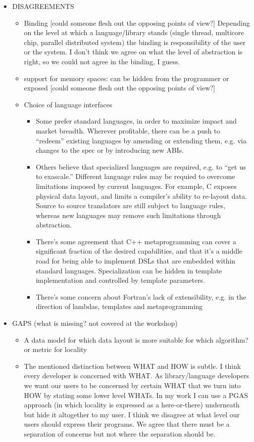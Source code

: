 \begin{itemize}
\item  DISAGREEMENTS
  \begin{itemize}
  \item Binding [could someone flesh out the opposing points of view?] Depending on the level at which a language/library stands (single thread, multicore chip, parallel distributed system) the binding is responsibility of the user or the system. I don't think we agree on what the level of abstraction is right, so we could not agree in the binding, I guess.
  \item support for memory spaces: can be hidden from the programmer or exposed [could someone flesh out the opposing points of view?]
  \item Choice of language interfaces
    \begin{itemize}
    \item Some prefer standard languages, in order to maximize impact and market breadth.  Wherever profitable, there can be a push to ``redeem'' existing languages by amending or extending them, e.g. via changes to the spec or by introducing new ABIs.
    \item Others believe that specialized languages are required, e.g. to ``get us to exascale.''  Different language rules may be requied to overcome limitations imposed by current languages.  For example, C exposes physical data layout, and limits a compiler's ability to re-layout data.  Source to source translators are still subject to language rules, whereas new languages may remove such limitations through abstraction.
    \item There's some agreement that C++ metaprogramming can cover a significant fraction of the desired capabilities, and that it's a middle road for being able to implement DSLs that are embedded within standard languages.  Specialization can be hidden in template implementation and controlled by template parameters.
    \item There's some concern about Fortran's lack of extensibility, e.g. in the direction of lambdas, templates and metaprogramming
    \end{itemize}
  \end{itemize}

\item GAPS (what is missing? not covered at the workshop)
  \begin{itemize}
  \item A data model for which data layout is more suitable for which algorithm? or metric for locality
  \item The mentioned distinction between WHAT and HOW is subtle. I think every developer is concerned with WHAT. As library/language developers we want our users to be concerned by certain WHAT that we turn into HOW by stating some lower level WHATs. In my work I can use a PGAS approach (in which locality is expressed as a here-or-there) underneath but hide it altogether to my user. I think we disagree at what level our users should express their programs. We agree that there must be a separation of concerns but not where the separation should be.
  \end{itemize}


\end{itemize}
